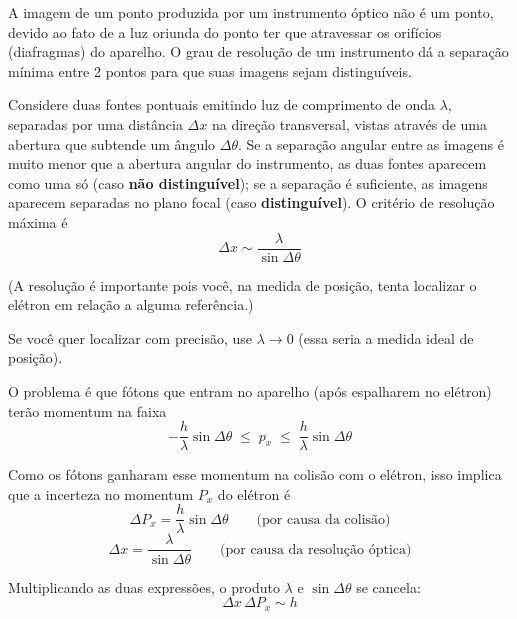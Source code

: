 A imagem de um ponto produzida por um instrumento óptico não é um ponto, devido ao fato de a luz oriunda do ponto ter que atravessar os orifícios (diafragmas) do aparelho. O grau de resolução de um instrumento dá a separação mínima entre 2 pontos para que suas imagens sejam distinguíveis.

Considere duas fontes pontuais emitindo luz de comprimento de onda $\lambda$, separadas por uma distância $\Delta x$ na direção transversal, vistas através de uma abertura que subtende um ângulo $\Delta\theta$. Se a separação angular entre as imagens é muito menor que a abertura angular do instrumento, as duas fontes aparecem como uma só (caso \textbf{não distinguível}); se a separação é suficiente, as imagens aparecem separadas no plano focal (caso \textbf{distinguível}). O critério de resolução máxima é
\begin{equation}
    \boxed{\Delta x \sim \frac{\lambda}{\sin\Delta\theta}}
\label{eq:aula13_resolucao}
\end{equation}

(A resolução é importante pois você, na medida de posição, tenta localizar o elétron em relação a alguma referência.)

Se você quer localizar com precisão, use $\lambda \to 0$ (essa seria a medida ideal de posição).

O problema é que fótons que entram no aparelho (após espalharem no elétron) terão momentum na faixa
\begin{equation}
    -\frac{h}{\lambda}\sin\Delta\theta \;\leq\; p_x \;\leq\; \frac{h}{\lambda}\sin\Delta\theta
\label{eq:aula13_faixa_px}
\end{equation}

Como os fótons ganharam esse momentum na colisão com o elétron, isso implica que a incerteza no momentum $P_x$ do elétron é
\begin{equation}
    \Delta P_x = \frac{h}{\lambda}\sin\Delta\theta \qquad \text{(por causa da colisão)}
\label{eq:aula13_DPx}
\end{equation}
\begin{equation}
    \Delta x = \frac{\lambda}{\sin\Delta\theta} \qquad \text{(por causa da resolução óptica)}
\label{eq:aula13_Dx_optica}
\end{equation}

Multiplicando as duas expressões, o produto $\lambda$ e $\sin\Delta\theta$ se cancela:
\begin{equation}
    \boxed{\Delta x \, \Delta P_x \sim h}
\label{eq:aula13_DxDp_heisenberg_microscopio}
\end{equation}

